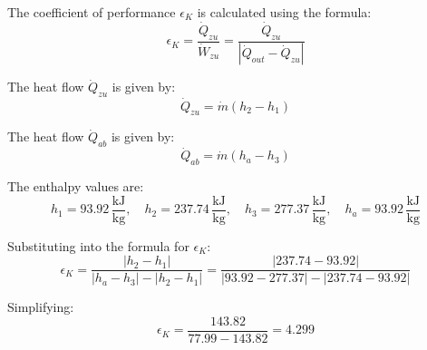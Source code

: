 The coefficient of performance \( \epsilon_K \) is calculated using the formula:  
\[
\epsilon_K = \frac{\dot{Q}_{zu}}{\dot{W}_{zu}} = \frac{\dot{Q}_{zu}}{|\dot{Q}_{out} - \dot{Q}_{zu}|}
\]  

The heat flow \( \dot{Q}_{zu} \) is given by:  
\[
\dot{Q}_{zu} = \dot{m} (h_2 - h_1)
\]  

The heat flow \( \dot{Q}_{ab} \) is given by:  
\[
\dot{Q}_{ab} = \dot{m} (h_a - h_3)
\]  

The enthalpy values are:  
\[
h_1 = 93.92 \, \frac{\text{kJ}}{\text{kg}}, \quad h_2 = 237.74 \, \frac{\text{kJ}}{\text{kg}}, \quad h_3 = 277.37 \, \frac{\text{kJ}}{\text{kg}}, \quad h_a = 93.92 \, \frac{\text{kJ}}{\text{kg}}
\]  

Substituting into the formula for \( \epsilon_K \):  
\[
\epsilon_K = \frac{|h_2 - h_1|}{|h_a - h_3| - |h_2 - h_1|} = \frac{|237.74 - 93.92|}{|93.92 - 277.37| - |237.74 - 93.92|}
\]  

Simplifying:  
\[
\epsilon_K = \frac{143.82}{77.99 - 143.82} = 4.299
\]